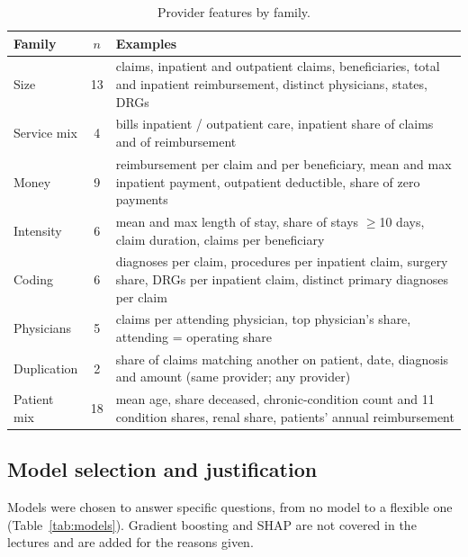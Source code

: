 \documentclass[11pt,a4paper]{article}
\begin{document}
\begin{table}[H]\centering\small
\caption{Provider features by family.}\label{tab:feat}
\begin{tabularx}{\linewidth}{lcX}
\toprule
Family & $n$ & Examples \\
\midrule
Size & 13 & claims, inpatient and outpatient claims, beneficiaries, total and inpatient reimbursement, distinct physicians, states, DRGs \\
Service mix & 4 & bills inpatient / outpatient care, inpatient share of claims and of reimbursement \\
Money & 9 & reimbursement per claim and per beneficiary, mean and max inpatient payment, outpatient deductible, share of zero payments \\
Intensity & 6 & mean and max length of stay, share of stays $\ge$10 days, claim duration, claims per beneficiary \\
Coding & 6 & diagnoses per claim, procedures per inpatient claim, surgery share, DRGs per inpatient claim, distinct primary diagnoses per claim \\
Physicians & 5 & claims per attending physician, top physician's share, attending = operating share \\
Duplication & 2 & share of claims matching another on patient, date, diagnosis and amount (same provider; any provider) \\
Patient mix & 18 & mean age, share deceased, chronic-condition count and 11 condition shares, renal share, patients' annual reimbursement \\
\bottomrule
\end{tabularx}
\end{table}

\subsection{Model selection and justification}

Models were chosen to answer specific questions, from no model to a flexible one (Table~\ref{tab:models}). Gradient boosting and SHAP are not covered in the lectures and are added for the reasons given.
\end{document}
